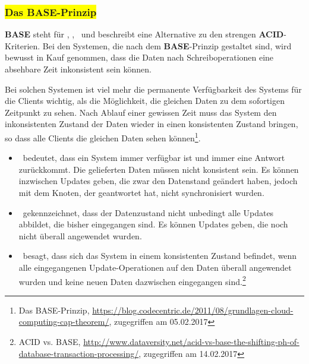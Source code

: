 %

\subsubsection{\colorbox{yellow}{Das BASE-Prinzip}}\label{base}

\textbf{BASE} steht für \BAse, \baSe, \basE\ und beschreibt eine Alternative zu den strengen \textbf{ACID}-Kriterien.
Bei den Systemen, die nach dem \textbf{BASE}-Prinzip gestaltet sind, wird bewusst in Kauf genommen, dass die Daten nach Schreiboperationen eine absehbare Zeit inkonsistent sein können.

Bei solchen Systemen ist viel mehr die permanente Verfügbarkeit des Systems für die Clients wichtig, als die Möglichkeit, die gleichen Daten zu dem sofortigen Zeitpunkt zu sehen. Nach Ablauf einer gewissen Zeit muss das System den inkonsistenten Zustand der Daten wieder in einen konsistenten Zustand bringen, so dass alle Clients die gleichen Daten sehen können\footnote{Das BASE-Prinzip, \url{https://blog.codecentric.de/2011/08/grundlagen-cloud-computing-cap-theorem/}, zugegriffen am 05.02.2017}.

\begin{itemize}
\item \BAse\ bedeutet, dass ein System immer verfügbar ist und immer eine Antwort zurückkommt. Die gelieferten Daten müssen nicht konsistent sein. Es können inzwischen Updates geben, die zwar den Datenstand geändert haben, jedoch mit dem Knoten, der geantwortet hat, nicht synchronisiert wurden.

\item \baSe\ gekennzeichnet, dass der Datenzustand nicht unbedingt alle Updates abbildet, die bisher eingegangen sind. Es können Updates geben, die noch nicht überall angewendet wurden.

\item \basE\ besagt, dass sich das System in einem konsistenten Zustand befindet, wenn alle eingegangenen Update-Operationen auf den Daten überall angewendet wurden und keine neuen Daten dazwischen eingegangen sind.\footnote{ACID vs. BASE, \url{http://www.dataversity.net/acid-vs-base-the-shifting-ph-of-database-transaction-processing/}, zugegriffen am 14.02.2017}
\end{itemize}






